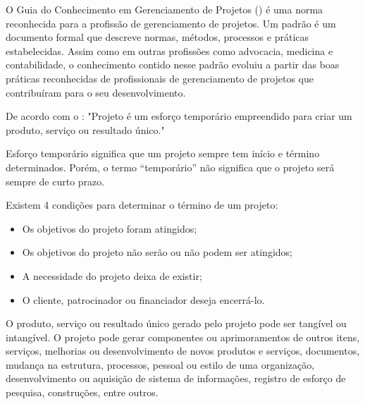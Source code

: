 

O Guia do Conhecimento em Gerenciamento de Projetos (\bok) é uma norma reconhecida para a profissão de gerenciamento de projetos. Um padrão é um documento formal que descreve normas, métodos, processos e práticas estabelecidas. Assim como em outras profissões como advocacia, medicina e contabilidade, o conhecimento contido nesse padrão evoluiu a partir das boas práticas reconhecidas de profissionais de gerenciamento de projetos que contribuíram para o seu desenvolvimento.


De acordo com o \bok: "Projeto é um esforço temporário empreendido para criar um produto, serviço ou resultado único." \citep[p. 3]{pmbok}

Esforço temporário significa que um projeto sempre tem início e término determinados. Porém, o termo ``temporário'' não significa que o projeto será sempre de curto prazo.

Existem 4 condições para determinar o término de um projeto:

\begin{itemize}
	\item Os objetivos do projeto foram atingidos;
	\item Os objetivos do projeto não serão ou não podem ser atingidos;
	\item A necessidade do projeto deixa de existir;
	\item O cliente, patrocinador ou financiador deseja encerrá-lo.
\end{itemize}

O produto, serviço ou resultado único gerado pelo projeto pode ser tangível ou intangível. O projeto pode gerar componentes ou aprimoramentos de outros itens, serviços, melhorias ou desenvolvimento de novos produtos e serviços, documentos, mudança na estrutura, processos, pessoal ou estilo de uma organização, desenvolvimento ou aquisição de sistema de informações, registro de esforço de pesquisa, construções, entre outros.